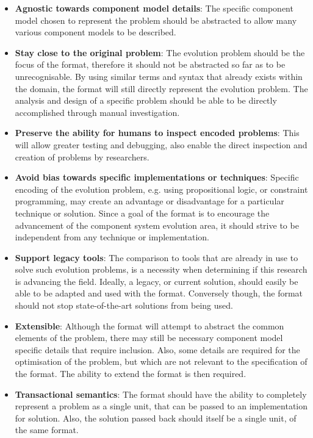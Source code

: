 \begin{itemize}
  \item \textbf{Agnostic towards component model details}: 
  The specific component model chosen to represent the problem should be abstracted to allow many various component models to be described.  
  \item \textbf{Stay close to the original problem}: 
  The evolution problem should be the focus of the format, therefore it should not be abstracted so far as to be unrecognisable. 
  By using similar terms and syntax that already exists within the domain, the format will still directly represent the evolution problem. 
  The analysis and design of a specific problem should be able to be directly accomplished through manual investigation.
  \item \textbf{Preserve the ability for humans to inspect encoded problems}:
  This will allow greater testing and debugging, also enable the direct inspection and creation of problems by researchers.
  \item \textbf{Avoid bias towards specific implementations or techniques}:
  Specific encoding of the evolution problem, e.g. using propositional logic, or constraint programming, may create an advantage or disadvantage for a particular technique or solution.
  Since a goal of the format is to encourage the advancement of the component system evolution area, it should strive to be independent from any technique or implementation. 
  \item \textbf{Support legacy tools}:
  The comparison to tools that are already in use to solve such evolution problems, is a necessity when determining if this research is advancing the field.
  Ideally, a legacy, or current solution, should easily be able to be adapted and used with the format.
  Conversely though, the format should not stop state-of-the-art solutions from being used.
  \item \textbf{Extensible}:
  Although the format will attempt to abstract the common elements of the problem, there may still be necessary component model specific details that require inclusion.
  Also, some details are required for the optimisation of the problem, but which are not relevant to the specification of the format.
  The ability to extend the format is then required.
  \item \textbf{Transactional semantics}:
  The format should have the ability to completely represent a problem as a single unit, that can be passed to an implementation for solution.
  Also, the solution passed back should itself be a single unit, of the same format.

\end{itemize}
